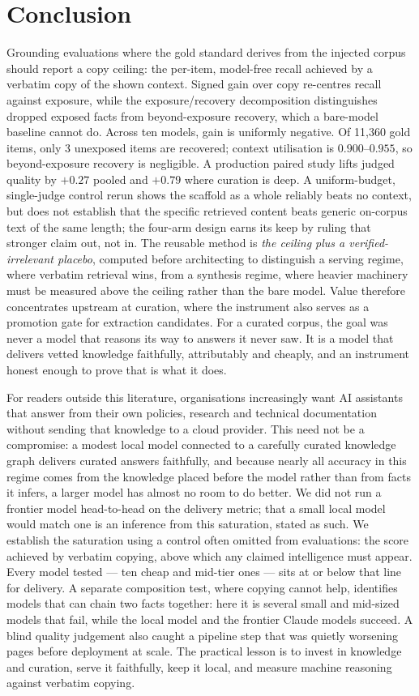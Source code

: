\documentclass[10pt,twocolumn]{article}
\begin{document}
\section{Conclusion}\label{sec:conclusion}
Grounding evaluations where the gold standard derives from the injected corpus should report a copy ceiling: the per-item, model-free recall achieved by a verbatim copy of the shown context. Signed gain over copy re-centres recall against exposure, while the exposure/recovery decomposition distinguishes dropped exposed facts from beyond-exposure recovery, which a bare-model baseline cannot do. Across ten models, gain is uniformly negative. Of 11{,}360 gold items, only 3 unexposed items are recovered; context utilisation is $0.900$--$0.955$, so beyond-exposure recovery is negligible. A production paired study lifts judged quality by $+0.27$ pooled and $+0.79$ where curation is deep. A uniform-budget, single-judge control rerun shows the scaffold as a whole reliably beats no context, but does not establish that the specific retrieved content beats generic on-corpus text of the same length; the four-arm design earns its keep by ruling that stronger claim out, not in. The reusable method is \emph{the ceiling plus a verified-irrelevant placebo}, computed before architecting to distinguish a serving regime, where verbatim retrieval wins, from a synthesis regime, where heavier machinery must be measured above the ceiling rather than the bare model. Value therefore concentrates upstream at curation, where the instrument also serves as a promotion gate for extraction candidates. For a curated corpus, the goal was never a model that reasons its way to answers it never saw. It is a model that delivers vetted knowledge faithfully, attributably and cheaply, and an instrument honest enough to prove that is what it does.

For readers outside this literature, organisations increasingly want AI assistants that answer from their own policies, research and technical documentation without sending that knowledge to a cloud provider. This need not be a compromise: a modest local model connected to a carefully curated knowledge graph delivers curated answers faithfully, and because nearly all accuracy in this regime comes from the knowledge placed before the model rather than from facts it infers, a larger model has almost no room to do better. We did not run a frontier model head-to-head on the delivery metric; that a small local model would match one is an inference from this saturation, stated as such. We establish the saturation using a control often omitted from evaluations: the score achieved by verbatim copying, above which any claimed intelligence must appear. Every model tested --- ten cheap and mid-tier ones --- sits at or below that line for delivery. A separate composition test, where copying cannot help, identifies models that can chain two facts together: here it is several small and mid-sized models that fail, while the local model and the frontier Claude models succeed. A blind quality judgement also caught a pipeline step that was quietly worsening pages before deployment at scale. The practical lesson is to invest in knowledge and curation, serve it faithfully, keep it local, and measure machine reasoning against verbatim copying.
\end{document}
